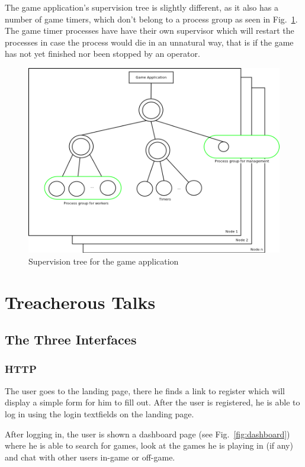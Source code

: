 \documentclass[11pt,a4paper]{report}
\begin{document}
The game application's supervision tree is slightly different, as it also has a
number of game timers, which don't belong to a process group as seen in
Fig.~\ref{fig:game_app}. The game timer processes have have their own supervisor
which will restart the processes in case the process would die in an unnatural
way, that is if the game has not yet finished nor been stopped by an operator.
\begin{figure}[h]
 \centering
 \includegraphics[width=\textwidth]{./graphics/game_Application.png}
 \caption{Supervision tree for the game application}
 \label{fig:game_app}
\end{figure}

\chapter{Treacherous Talks}
\section{The Three Interfaces}
\subsection{HTTP}
The user goes to the landing page, there he finds a link to register which will
display a simple form for him to fill out. After the user is registered, he is
able to log in using the login textfields on the landing page.

After logging in, the user is shown a dashboard page (see Fig.~\ref{fig:dashboard})
where he is able to search for games, look at the games he is playing in (if
any) and chat with other users in-game or off-game.
\end{document}
